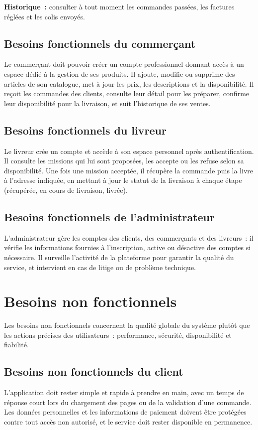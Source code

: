 \documentclass[12pt,fleqn,a4paper]{report}
\begin{document}
\begin{justify}
\vspace{0.3cm}
\textbf{Historique~:} consulter à tout moment les commandes passées, les factures réglées et les colis envoyés.

\subsection{Besoins fonctionnels du commerçant}
Le commerçant doit pouvoir créer un compte professionnel donnant accès à un espace dédié à la gestion de ses produits. Il ajoute, modifie ou supprime des articles de son catalogue, met à jour les prix, les descriptions et la disponibilité. Il reçoit les commandes des clients, consulte leur détail pour les préparer, confirme leur disponibilité pour la livraison, et suit l'historique de ses ventes.

\subsection{Besoins fonctionnels du livreur}
Le livreur crée un compte et accède à son espace personnel après authentification. Il consulte les missions qui lui sont proposées, les accepte ou les refuse selon sa disponibilité. Une fois une mission acceptée, il récupère la commande puis la livre à l'adresse indiquée, en mettant à jour le statut de la livraison à chaque étape (récupérée, en cours de livraison, livrée).

\subsection{Besoins fonctionnels de l'administrateur}
L'administrateur gère les comptes des clients, des commerçants et des livreurs~: il vérifie les informations fournies à l'inscription, active ou désactive des comptes si nécessaire. Il surveille l'activité de la plateforme pour garantir la qualité du service, et intervient en cas de litige ou de problème technique.

\section{Besoins non fonctionnels}

Les besoins non fonctionnels concernent la qualité globale du système plutôt que les actions précises des utilisateurs~: performance, sécurité, disponibilité et fiabilité.

\subsection{Besoins non fonctionnels du client}
L'application doit rester simple et rapide à prendre en main, avec un temps de réponse court lors du chargement des pages ou de la validation d'une commande. Les données personnelles et les informations de paiement doivent être protégées contre tout accès non autorisé, et le service doit rester disponible en permanence.


\end{justify}
\end{document}
